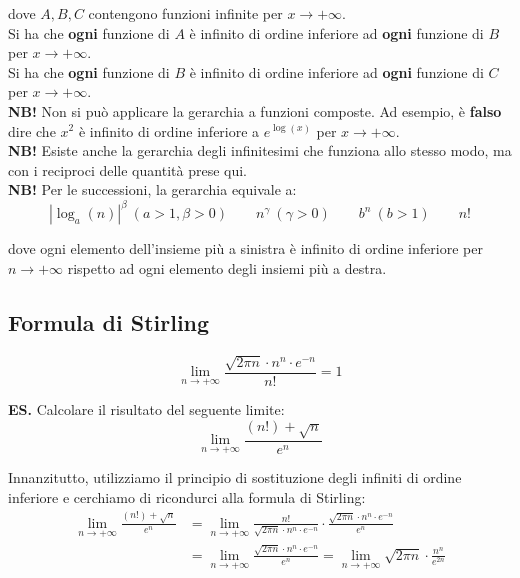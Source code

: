 \documentclass{article}
\begin{document}
\noindent dove $A, B, C$ contengono funzioni infinite per $x \to +\infty$.\\
Si ha che \textbf{ogni} funzione di $A$ è infinito di ordine inferiore ad \textbf{ogni} funzione di $B$ per $x \to +\infty$.\\
Si ha che \textbf{ogni} funzione di $B$ è infinito di ordine inferiore ad \textbf{ogni} funzione di $C$ per $x \to +\infty$.\\

\noindent\textbf{NB!} Non si può applicare la gerarchia a funzioni composte. Ad esempio, è \textbf{falso} dire che $x^2$ è infinito di ordine inferiore a $e^{\log(x)}$ per $x \to +\infty$.\\

\noindent\textbf{NB!} Esiste anche la gerarchia degli infinitesimi che funziona allo stesso modo, ma con i reciproci delle quantità prese qui.\\

\noindent\textbf{NB!} Per le successioni, la gerarchia equivale a:
\begin{equation*}
    |\log_a(n)|^\beta \ (a > 1, \beta > 0) \qquad n^\gamma \ (\gamma > 0) \qquad b^n \ (b > 1) \qquad n!
\end{equation*}

\noindent dove ogni elemento dell'insieme più a sinistra è infinito di ordine inferiore per $n \to +\infty$ rispetto ad ogni elemento degli insiemi più a destra.

\subsection{Formula di Stirling}
\begin{equation*}
    \lim_{n \to +\infty} \frac{\sqrt{2\pi n} \cdot n^n \cdot e^{-n}}{n!} = 1
\end{equation*}

\noindent\textbf{ES.} Calcolare il risultato del seguente limite:
\begin{equation*}
    \lim_{n \to +\infty} \frac{(n!) + \sqrt{n}}{e^n}
\end{equation*}

\noindent Innanzitutto, utilizziamo il principio di sostituzione degli infiniti di ordine inferiore e cerchiamo di ricondurci alla formula di Stirling: 
\begin{align*}
    \lim_{n \to +\infty} \frac{(n!) + \sqrt{n}}{e^n} &= \lim_{n \to +\infty} \frac{n!}{\sqrt{2\pi n} \cdot n^n \cdot e^{-n}} \cdot \frac{\sqrt{2\pi n} \cdot n^n \cdot e^{-n}}{e^n}\\
    &= \lim_{n \to +\infty} \frac{\sqrt{2\pi n} \cdot n^n \cdot e^{-n}}{e^n} = \lim_{n \to +\infty} \sqrt{2\pi n} \cdot \frac{n^n}{e^{2n}}
\end{align*}
\end{document}
